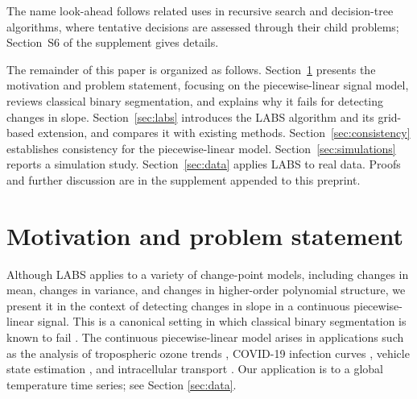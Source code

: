 \documentclass[12pt, a4paper]{article}
\begin{document}
The name look-ahead follows related uses in recursive search and decision-tree algorithms, where tentative decisions are assessed through their child problems; Section~S6 of the supplement gives details.

The remainder of this paper is organized as follows. Section~\ref{sec:motivation} presents the motivation and problem statement, focusing on the piecewise-linear signal model, reviews classical binary segmentation, and explains why it fails for detecting changes in slope. Section~\ref{sec:labs} introduces the LABS algorithm and its grid-based extension, and compares it with existing methods. Section~\ref{sec:consistency} establishes consistency for the piecewise-linear model. Section~\ref{sec:simulations} reports a simulation study. Section~\ref{sec:data} applies LABS to real data. Proofs and further discussion are in the supplement appended to this preprint.


\section{Motivation and problem statement}
\label{sec:motivation}

Although LABS applies to a variety of change-point models, including changes in mean, changes in variance, and changes in higher-order polynomial structure, we present it in the context of detecting changes in slope in a continuous piecewise-linear signal. This is a canonical setting in which classical binary segmentation is known to fail \citep{bcf16, mfl19}. The continuous piecewise-linear model arises in applications such as the analysis of tropospheric ozone trends \citep{csks23}, COVID-19 infection curves \citep{jzs23}, vehicle state estimation \citep{hkpck25}, and intracellular transport \citep{ddcm25}.
Our application is to a global temperature time series; see Section \ref{sec:data}.
\end{document}
